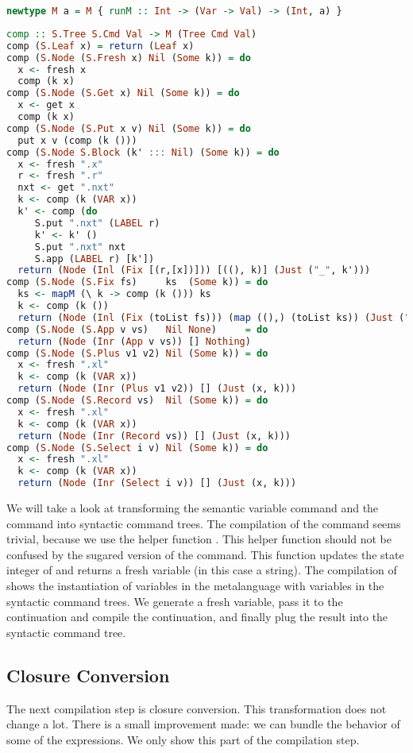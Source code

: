 \begin{lstlisting}[language=Haskell]
newtype M a = M { runM :: Int -> (Var -> Val) -> (Int, a) }
\end{lstlisting}

\begin{lstlisting}[language=Haskell]
comp :: S.Tree S.Cmd Val -> M (Tree Cmd Val)
comp (S.Leaf x) = return (Leaf x)
comp (S.Node (S.Fresh x) Nil (Some k)) = do
  x <- fresh x
  comp (k x)
comp (S.Node (S.Get x) Nil (Some k)) = do
  x <- get x
  comp (k x)
comp (S.Node (S.Put x v) Nil (Some k)) = do
  put x v (comp (k ()))
comp (S.Node S.Block (k' ::: Nil) (Some k)) = do
  x <- fresh ".x"
  r <- fresh ".r"
  nxt <- get ".nxt"
  k <- comp (k (VAR x))
  k' <- comp (do
     S.put ".nxt" (LABEL r)
     k' <- k' ()
     S.put ".nxt" nxt
     S.app (LABEL r) [k'])
  return (Node (Inl (Fix [(r,[x])])) [((), k)] (Just ("_", k')))
comp (S.Node (S.Fix fs)     ks  (Some k)) = do
  ks <- mapM (\ k -> comp (k ())) ks
  k <- comp (k ())
  return (Node (Inl (Fix (toList fs))) (map ((),) (toList ks)) (Just ("_", k)))
comp (S.Node (S.App v vs)   Nil None)     = do
  return (Node (Inr (App v vs)) [] Nothing)
comp (S.Node (S.Plus v1 v2) Nil (Some k)) = do
  x <- fresh ".xl"
  k <- comp (k (VAR x))
  return (Node (Inr (Plus v1 v2)) [] (Just (x, k)))
comp (S.Node (S.Record vs)  Nil (Some k)) = do
  x <- fresh ".xl"
  k <- comp (k (VAR x))
  return (Node (Inr (Record vs)) [] (Just (x, k)))
comp (S.Node (S.Select i v) Nil (Some k)) = do
  x <- fresh ".xl"
  k <- comp (k (VAR x))
  return (Node (Inr (Select i v)) [] (Just (x, k)))
\end{lstlisting}

We will take a look at transforming the semantic  variable command and the  command into syntactic command trees. The compilation of the  command seems trivial, because we use the helper function . This helper function should not be confused by the sugared version of the  command. This function updates the state integer of  and returns a fresh variable (in this case a string). The compilation of  shows the instantiation of variables in the metalanguage with variables in the syntactic command trees. We generate a fresh variable, pass it to the continuation and compile the continuation, and finally plug the result into the syntactic command tree.

\subsection{\label{subsection:closconvert2}Closure Conversion}
The next compilation step is closure conversion. This transformation does not change a lot. There is a small improvement made: we can bundle the behavior of some of the  expressions. We only show this part of the compilation step.


